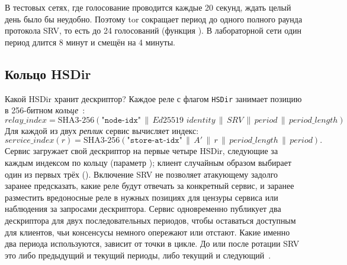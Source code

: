 В тестовых сетях, где голосование проводится каждые 20 секунд, ждать целый день было бы неудобно. Поэтому tor сокращает период до одного полного раунда протокола SRV, то есть до 24 голосований (функция ). В лабораторной сети один период длится 8 минут и смещён на 4 минуты.

\subsection{Кольцо HSDir}

Какой HSDir хранит дескриптор? Каждое реле с флагом \texttt{HSDir} занимает позицию в 256-битном \emph{кольце}~:
\[
\mathit{relay\_index} = \mathrm{SHA3\text{-}256}(\texttt{"node-idx"} \,\|\, \textit{Ed25519 identity} \,\|\, \mathit{SRV} \,\|\, \mathit{period} \,\|\, \mathit{period\_length})
\]
Для каждой из двух \emph{реплик} сервис вычисляет индекс:
\[
\mathit{service\_index}(r) = \mathrm{SHA3\text{-}256}(\texttt{"store-at-idx"} \,\|\, A' \,\|\, r \,\|\, \mathit{period\_length} \,\|\, \mathit{period}).
\]
Сервис загружает свой дескриптор на первые четыре HSDir, следующие за каждым индексом по кольцу (параметр ); клиент случайным образом выбирает один из первых трёх (). Включение SRV не позволяет атакующему задолго заранее предсказать, какие реле будут отвечать за конкретный сервис, и заранее разместить вредоносные реле в нужных позициях для цензуры сервиса или наблюдения за запросами дескриптора. Сервис одновременно публикует два дескриптора для двух последовательных периодов, чтобы оставаться доступным для клиентов, чьи консенсусы немного опережают или отстают. Какие именно два периода используются, зависит от точки в цикле. До или после ротации SRV это либо предыдущий и текущий периоды, либо текущий и следующий~.

